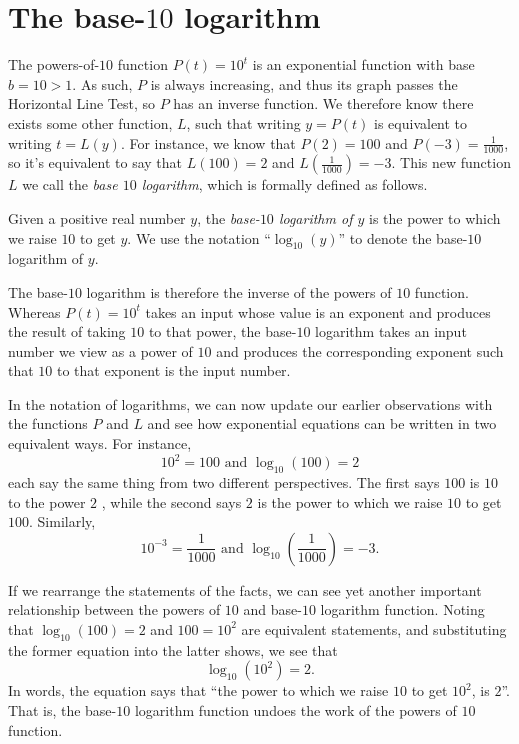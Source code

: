 \documentclass[nooutcomes]{ximera}
\begin{document}
\section{The base-\(10\) logarithm}

The powers-of-\(10\) function \(P(t) = 10^t\) is an exponential function with base \(b = 10 > 1\).  As such, \(P\) is always increasing, and thus its graph passes the Horizontal Line Test, so \(P\) has an inverse function.  We therefore know there exists some other function, \(L\), such that writing \(y = P(t)\) is equivalent to writing \(t = L(y)\).  For instance, we know that \(P(2)=100\) and \(P(-3)=\frac{1}{1000}\), so it's equivalent to say that \(L(100) = 2\) and \(L\left(\frac{1}{1000}\right) = -3\).  This new function \(L\) we call the \emph{base \(10\) logarithm}, which is formally defined as follows.%

Given a positive real number \(y\), the \emph{base-\(10\) logarithm of \(y\)} is the power to which we raise \(10\) to get \(y\).  We use the notation ``\(\log_{10}(y)\)'' to denote the base-\(10\) logarithm of \(y\).%

The base-\(10\) logarithm is therefore the inverse of the powers of \(10\) function.  Whereas \(P(t) = 10^t\) takes an input whose value is an exponent and produces the result of taking \(10\) to that power, the base-\(10\) logarithm takes an input number we view as a power of \(10\) and produces the corresponding exponent such that \(10\) to that exponent is the input number.%

In the notation of logarithms, we can now update our earlier observations with the functions \(P\) and \(L\) and see how exponential equations can be written in two equivalent ways.  For instance,%
\begin{equation}
10^2 = 100 \text{ and } \log_{10}(100) = 2\label{eq-exp-log-base-10-2}
\end{equation}
each say the same thing from two different perspectives.  The first says \(100\) is \(10\) to the power \(2\) , while the second says \(2\) is the power to which we raise \(10\) to get \(100\).  Similarly,%
\begin{equation}
10^{-3} = \frac{1}{1000} \text{ and } \log_{10} \left( \frac{1}{1000} \right) = -3\text{.}\label{eq-exp-log-base-10-minus-3}
\end{equation}

If we rearrange the statements of the facts, we can see yet another important relationship between the powers of \(10\) and base-\(10\) logarithm function.  Noting that \(\log_{10}(100) = 2\) and \(100 = 10^2\) are equivalent statements, and substituting the former equation into the latter shows, we see that%
\begin{equation}
\log_{10}(10^2) = 2\text{.}
\end{equation}
In words, the equation says that ``the power to which we raise \(10\) to get \(10^2\), is \(2\)''.  That is, the base-\(10\) logarithm function undoes the work of the powers of \(10\) function.%
\end{document}
